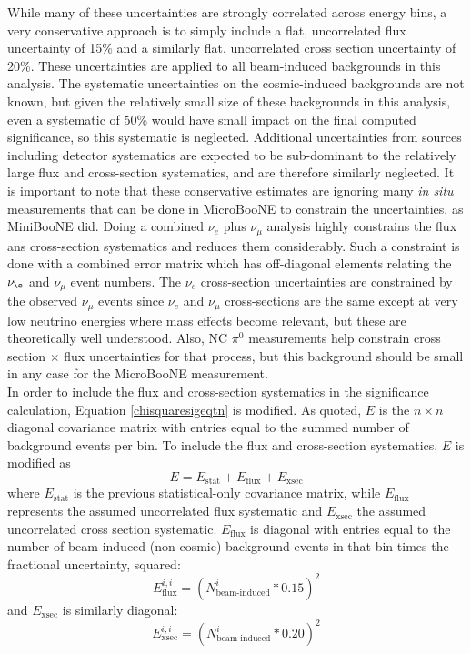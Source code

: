 While many of these uncertainties are strongly correlated across energy bins, a very conservative approach is to simply include a flat, uncorrelated flux uncertainty of 15\% and a similarly flat, uncorrelated cross section uncertainty of 20\%. These uncertainties are applied to all beam-induced backgrounds in this analysis. The systematic uncertainties on the cosmic-induced backgrounds are not known, but given the relatively small size of these backgrounds in this analysis, even a systematic of 50\% would have small impact on the final computed significance, so this systematic is neglected. Additional uncertainties from sources including detector systematics are expected to be sub-dominant to the relatively large flux and cross-section systematics, and are therefore similarly neglected. It is important to note that these conservative estimates are ignoring many \textit{in situ} measurements that can be done in MicroBooNE to constrain the uncertainties, as MiniBooNE did. Doing a combined $\nu_e$ plus $\nu_\mu$ analysis highly constrains the flux ans cross-section systematics and reduces them considerably. Such a constraint is done with a combined error matrix which has off-diagonal elements relating the $\nu_\e$ and $\nu_\mu$ event numbers. The $\nu_e$ cross-section uncertainties are constrained by the observed $\nu_\mu$ events since $\nu_e$ and $\nu_\mu$ cross-sections are the same except at very low neutrino energies where mass effects become relevant, but these are theoretically well understood. Also, NC $\pi^0$ measurements help constrain cross section $\times$ flux uncertainties for that process, but this background should be small in any case for the MicroBooNE measurement.\\

In order to include the flux and cross-section systematics in the significance calculation, Equation \ref{chisquaresigeqtn} is modified. As quoted, $E$ is the $n\times n$ diagonal covariance matrix with entries equal to the summed number of background events per bin. To include the flux and cross-section systematics, $E$ is modified as
\begin{equation}\label{LEE_emtx_systematics}
E = E_{\text{stat}} + E_{\text{flux}} + E_{\text{xsec}}
\end{equation}
where $E_{\text{stat}}$ is the previous statistical-only covariance matrix, while $E_{\text{flux}}$ represents the assumed uncorrelated flux systematic and $E_{\text{xsec}}$ the assumed uncorrelated cross section systematic. $E_{\text{flux}}$ is diagonal with entries equal to the number of beam-induced (non-cosmic) background events in that bin times the fractional uncertainty, squared:
\begin{equation}\label{LEE_flux_emtx}
E_{\text{flux}}^{i,i} = (N_{\text{beam-induced}}^i*0.15)^2
\end{equation}
and $E_{\text{xsec}}$ is similarly diagonal:
\begin{equation}\label{LEE_xsec_emtx}
E_{\text{xsec}}^{i,i} = (N_{\text{beam-induced}}^i*0.20)^2
\end{equation}


